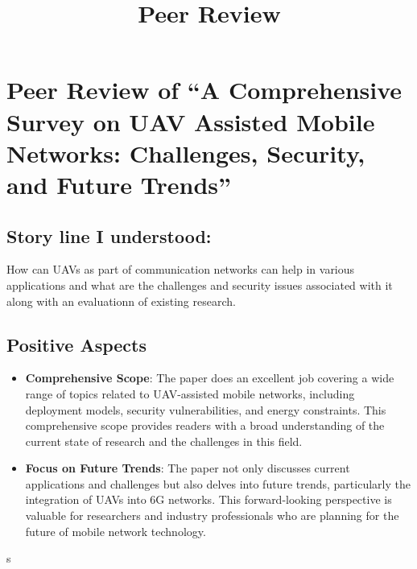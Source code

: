 \documentclass[12pt]{article}
\title{Peer Review}
\author{}
\date{}
\begin{document}
\maketitle

\section*{Peer Review of ``A Comprehensive Survey on UAV Assisted Mobile Networks: Challenges, Security, and Future Trends''}

\subsection{Story line I understood:} 
How can UAVs as part of communication networks can help in various applications and what are the challenges and security issues associated with it along with an evaluationn of existing research.
\subsection*{Positive Aspects}
\begin{itemize}
    \item \textbf{Comprehensive Scope}: The paper does an excellent job covering a wide range of topics related to UAV-assisted mobile networks, including deployment models, security vulnerabilities, and energy constraints. This comprehensive scope provides readers with a broad understanding of the current state of research and the challenges in this field.
    \item \textbf{Focus on Future Trends}: The paper not only discusses current applications and challenges but also delves into future trends, particularly the integration of UAVs into 6G networks. This forward-looking perspective is valuable for researchers and industry professionals who are planning for the future of mobile network technology.
\end{itemize}
s
\end{document}
